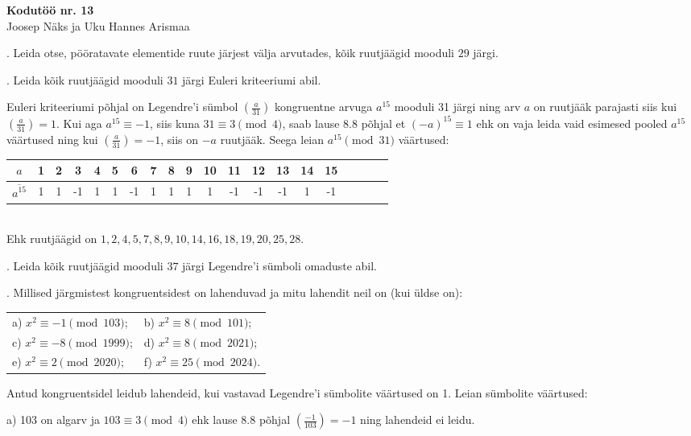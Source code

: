 \documentclass[a4paper, 10pt]{article}
\newcommand{\w}{\overline}
\newcommand{\leg}[2]{\left(\frac{#1}{#2}\right)}
\begin{document}
\begin{center}
\Large\textbf{Kodutöö nr. 13}\\
\small{Joosep Näks ja Uku Hannes Arismaa}
\end{center}


\bigskip

. Leida otse, pööratavate elementide ruute järjest välja arvutades, kõik ruutj\"a\"agid mooduli $29$ j\"argi.

\bigskip

. Leida kõik ruutj\"a\"agid mooduli $31$ j\"argi Euleri kriteeriumi abil.

\bigskip
Euleri kriteeriumi põhjal on Legendre'i sümbol $\leg a{31}$ kongruentne arvuga $a^{15}$ mooduli 31 järgi ning arv $a$ on ruutjääk parajasti siis kui $\leg a{31}=1$. Kui aga $a^{15}\equiv-1$, siis kuna $31\equiv3\pmod4$, saab lause 8.8 põhjal et $(-a)^{15}\equiv1$ ehk on vaja leida vaid esimesed pooled $a^{15}$ väärtused ning kui $\leg a{31}=-1$, siis on $-a$ ruutjääk. Seega leian $a^{15}\pmod{31}$ väärtused:\\
\begin{tabular}{c|ccccccccccccccccccc}
$a$&1&2&3&4&5&6&7&8&9&10&11&12&13&14&15\\
\hline
$\w{a^{15}}$&1&1&-1&1&1&-1&1&1&1&1&-1&-1&-1&1&-1
\end{tabular}\\
Ehk ruutjäägid on $1,2,4,5,7,8,9,10,14,16,18,19,20,25,28$.
\bigskip

. Leida kõik ruutj\"a\"agid mooduli $37$ j\"argi Legendre'i sümboli omaduste abil.

\bigskip

. Millised järgmistest kongruentsidest on lahenduvad ja mitu lahendit neil on (kui üldse on):

\begin{tabular}{p{6cm}p{6cm}}
a) $x^2\equiv -1 \pmod{103}$;&b) $x^2\equiv 8 \pmod{101}$;\\
c) $x^2\equiv -8 \pmod{1999}$;&d) $x^2\equiv 8 \pmod{2021}$;\\
e) $x^2\equiv 2 \pmod{2020}$;&f) $x^2\equiv 25 \pmod{2024}$.\\
\end{tabular}

\bigskip
Antud kongruentsidel leidub lahendeid, kui vastavad Legendre'i sümbolite väärtused on 1. Leian sümbolite väärtused:

a) 103 on algarv ja $103\equiv3\pmod4$ ehk lause 8.8 põhjal $\leg {-1}{103}=-1$ ning lahendeid ei leidu.
\end{document}
